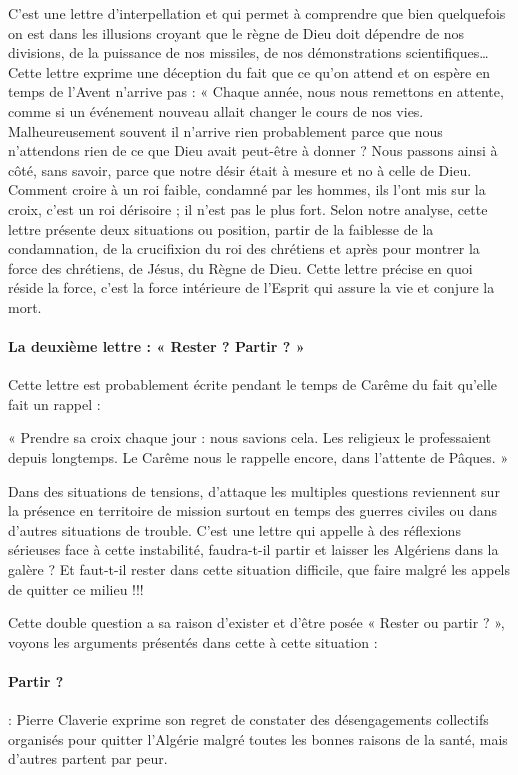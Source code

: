 C’est une lettre d’interpellation et qui permet à comprendre que bien quelquefois on est dans les illusions croyant que le règne de Dieu doit dépendre de nos divisions, de la puissance de nos missiles, de nos démonstrations scientifiques…
Cette lettre exprime une déception du fait que ce qu’on attend et on espère en temps de l’Avent n’arrive pas : « Chaque année, nous nous remettons en attente, comme si un événement nouveau allait changer le cours de nos vies. Malheureusement souvent il n’arrive rien probablement parce que nous n’attendons rien de ce que Dieu avait peut-être à donner ? Nous passons ainsi à côté, sans savoir, parce que notre désir était à mesure et no à celle de Dieu.
Comment croire à un roi faible, condamné par les hommes, ils l’ont mis sur la croix, c’est un roi dérisoire ; il n’est pas le plus fort. 
Selon notre analyse, cette lettre présente deux situations ou position, partir de la faiblesse de la condamnation, de la crucifixion du roi des chrétiens et après pour montrer la force des chrétiens, de Jésus, du Règne de Dieu. 
Cette lettre précise en quoi réside la force, c’est la force intérieure de l’Esprit qui assure la vie et conjure la mort.

\paragraph{La deuxième lettre : « Rester ? Partir ? »}
 
Cette lettre est probablement écrite pendant le temps de Carême du fait qu’elle fait un rappel : \begin{singlequote}
    « Prendre sa croix chaque jour : nous savions cela. Les religieux le professaient depuis longtemps. Le Carême nous le rappelle encore, dans l’attente de Pâques. »
\end{singlequote}
Dans des situations de tensions, d’attaque les multiples questions reviennent sur la présence en territoire de mission surtout en temps des guerres civiles ou dans d’autres situations de trouble. C’est une lettre qui appelle à des réflexions sérieuses face à cette instabilité, faudra-t-il partir et laisser les Algériens dans la galère ? Et faut-t-il rester dans cette situation difficile, que faire malgré les appels de quitter ce milieu !!! 


Cette double question a sa raison d’exister et d’être posée « Rester ou partir ? », voyons les arguments présentés dans cette à cette situation :
\paragraph{Partir ?} : Pierre Claverie exprime son regret de constater des désengagements collectifs organisés pour quitter l’Algérie malgré toutes les bonnes raisons de la santé, mais d’autres partent par peur. 

